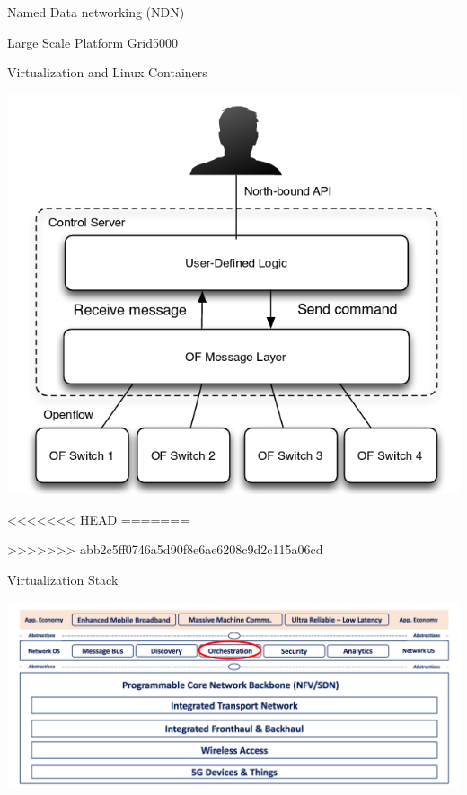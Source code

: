 \documentclass[8pt]{beamer}
\newcommand{\1}{\mathbbm 1}
\begin{document}
\begin{frame}{Named Data networking (NDN)}
\begin{frame}{Large Scale Platform Grid5000}
\begin{frame}{Virtualization and Linux Containers}
{\begin{center}
\includegraphics[scale=0.25]{figures/controller.png}
\end{center}
}

<<<<<<< HEAD
=======

>>>>>>> abb2c5ff0746a5d90f8e6ae6208c9d2c115a06cd
\end{frame}

\begin{frame}{Virtualization Stack}


\begin{center}
\includegraphics[scale=0.15]{figures/architecture.png}
\end{center}


\end{frame}
\end{frame}
\end{frame}
\end{document}
